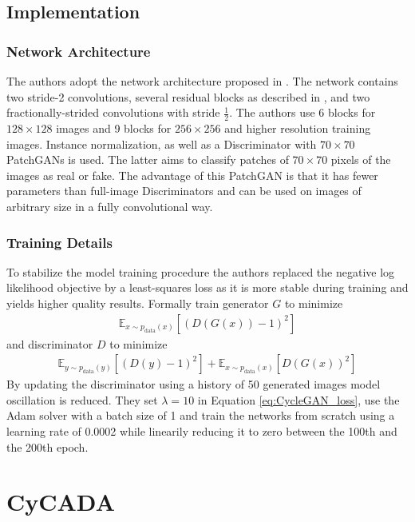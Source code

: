 \subsection{Implementation}
\subsubsection{Network Architecture}
The authors adopt the network architecture proposed in \cite{DBLP:journals/corr/JohnsonAL16}. The network contains two stride-2 convolutions, several residual blocks as described in \cite{DBLP:journals/corr/HeZRS15}, and two fractionally-strided convolutions with stride $\frac{1}{2}$. The authors use 6 blocks for $128 \times 128$ images and 9 blocks for $256 \times 256$ and higher resolution training images. Instance normalization, as well as a Discriminator with $70 \times 70$ PatchGANs is used. The latter aims to classify patches of $70\times 70$ pixels of the images as real or fake. The advantage of this PatchGAN is that it has fewer parameters than full-image Discriminators and can be used on images of arbitrary size in a fully convolutional way.

\subsubsection{Training Details}
To stabilize the model training procedure the authors replaced the negative log likelihood objective by a least-squares loss as it is more stable during training and yields higher quality results. Formally train generator $G$ to minimize 
\begin{align*}
	\mathbb{E}_{x\sim p_{\text{data}}(x)}[(D(G(x)) - 1)^2]
\end{align*} 
and discriminator $D$ to minimize
\begin{align*}
	\mathbb{E}_{y\sim p_{\text{data}}(y)}[(D(y) - 1)^2] + \mathbb{E}_{x\sim p_{\text{data}}(x)}[D(G(x))^2]
\end{align*}
By updating the discriminator using a history of 50 generated images model oscillation is reduced. They set $\lambda = 10$ in Equation \ref{eq:CycleGAN_loss}, use the Adam solver with a batch size of 1 and train the networks from scratch using a learning rate of 0.0002 while linearily reducing it to zero between the 100th and the 200th epoch.

\section{CyCADA} 
